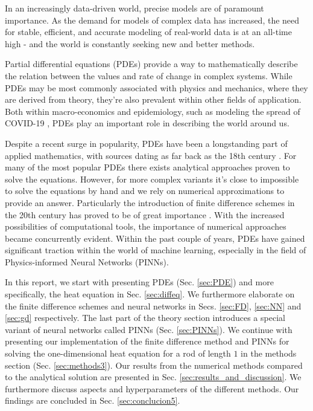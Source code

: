 In an increasingly data-driven world, precise models are of paramount importance.
As the demand for models of complex data has increased, the need for stable, efficient, and accurate modeling of real-world data is at an all-time high - and the world is constantly seeking new and better methods.

Partial differential equations (PDEs) provide a way to mathematically describe the relation between the values and rate of change in complex systems.
While PDEs may be most commonly associated with physics and mechanics, where they are derived from theory, they're also prevalent within other fields of application.
Both within macro-economics \cite{ecoPDE} and epidemiology, such as modeling the spread of COVID-19 \cite{covidus}, PDEs play an important role in describing the world around us. 

Despite a recent surge in popularity, PDEs have been a longstanding part of applied mathematics, with sources dating as far back as the 18th century \cite{Cajori}. For many of the most popular PDEs there exists analytical approaches proven to solve the equations. However, for more complex variants it's close to impossible to solve the equations by hand and we rely on numerical approximations to provide an answer. Particularly the introduction of finite difference schemes in the 20th century has proved to be of great importance \cite{sloan2012}. With the increased possibilities of computational tools, the importance of numerical approaches became concurrently evident. Within the past couple of years, PDEs have gained significant traction within the world of machine learning, especially in the field of Physics-informed Neural Networks (PINNs).  

In this report, we start with presenting PDEs (Sec. \ref{sec:PDE}) and more specifically, the heat equation in Sec. \ref{sec:diffeq}.
We furthermore elaborate on the finite difference schemes and neural networks in Secs. \ref{sec:FD}, \ref{sec:NN} and \ref{sec:gd} respectively. 
The last part of the theory section introduces a special variant of neural networks called PINNs (Sec. \ref{sec:PINNs}).
We continue with presenting our implementation of the finite difference method and PINNs for solving the one-dimensional heat equation for a rod of length $1$ in the methods section (Sec. \ref{sec:methods3}).
Our results from the numerical methods compared to the analytical solution are presented in Sec. \ref{sec:results_and_discussion}.
We furthermore discuss aspects and hyperparameters of the different methods. 
Our findings are concluded in Sec. \ref{sec:conclucion5}.

